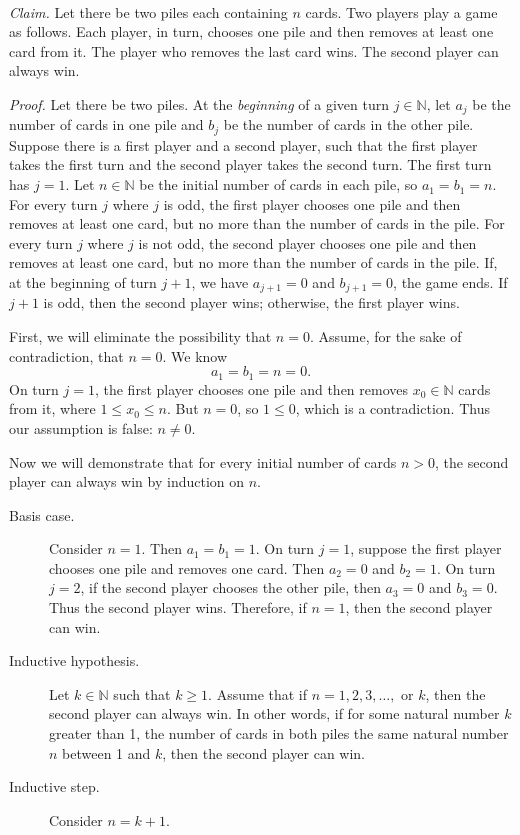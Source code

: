 \documentclass{article}
\theoremstyle{definition}
\begin{document}
\begin{solution}
~\newline

\noindent\textit{Claim. }Let there be two piles each containing $n$ cards. Two players play a game as follows. Each player, in turn, chooses one pile and then removes at least one card from it. The player who removes the last card wins. The second player can always win.\newline

\noindent\textit{Proof. }Let there be two piles. At the \textit{beginning} of a given turn $j\in\mathbb{N}$, let $a_j$ be the number of cards in one pile and $b_j$ be the number of cards in the other pile. Suppose there is a first player and a second player, such that the first player takes the first turn and the second player takes the second turn. The first turn has $j=1$. Let $n\in\mathbb{N}$ be the initial number of cards in each pile, so $a_1=b_1=n$. For every turn $j$ where $j$ is odd, the first player chooses one pile and then removes at least one card, but no more than the number of cards in the pile. For every turn $j$ where $j$ is not odd, the second player chooses one pile and then removes at least one card, but no more than the number of cards in the pile. If, at the beginning of turn $j+1$, we have $a_{j+1}=0$ and $b_{j+1}=0$, the game ends. If $j+1$ is odd, then the second player wins; otherwise, the first player wins.\newline

\noindent First, we will eliminate the possibility that $n=0$. Assume, for the sake of contradiction, that $n=0$. We know
\[a_1=b_1=n=0.\]
On turn $j=1$, the first player chooses one pile and then removes $x_0\in\mathbb{N}$ cards from it, where $1\leq x_0\leq n$. But $n=0$, so $1\leq 0$, which is a contradiction. Thus our assumption is false: $n\neq 0$.\newline

\noindent Now we will demonstrate that for every initial number of cards $n>0$, the second player can always win by induction on $n$.

\begin{description}
\item[Basis case.] Consider $n=1$. Then $a_1=b_1=1$. On turn $j=1$, suppose the first player chooses one pile and removes one card. Then $a_2=0$ and $b_2=1$. On turn $j=2$, if the second player chooses the other pile, then $a_3=0$ and $b_3=0$. Thus the second player wins. Therefore, if $n=1$, then the second player can win.
\item[Inductive hypothesis.] Let $k\in\mathbb{N}$ such that $k\geq 1$. Assume that if $n=1,2,3,\dots,\text{ or }k$, then the second player can always win. In other words, if for some natural number $k$ greater than 1, the number of cards in both piles the same natural number $n$ between 1 and $k$, then the second player can win.
\item[Inductive step.] Consider $n=k+1$.


\end{description}
\end{solution}
\end{document}
